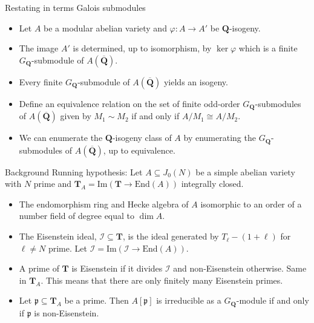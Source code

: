 \documentclass{beamer}
\newcommand{\QQ}{\mathbf{Q}}
\newcommand{\QQbar}{\overline{\mathbf{Q}}}
\newcommand{\TT}{\mathbf{T}}
\newcommand{\I}{\mathcal{I}}
\renewcommand{\Im}{\mathrm{Im}}
\newcommand{\End}{\mathrm{End}}
\newcommand{\p}{\mathfrak{p}}
\begin{document}
\begin{frame}{Restating in terms Galois submodules}
    \begin{itemize}
        \item
            Let $A$ be a modular abelian variety and $\varphi:A\to A'$ be
            $\QQ$-isogeny.
            \pause
        \item
            The image $A'$ is determined, up to isomorphism, by $\ker\varphi$
            which is a finite $G_\QQ$-submodule of $A(\QQbar)$.
            \pause
        \item
            Every finite $G_\QQ$-submodule of $A(\QQbar)$ yields an isogeny.
            \pause
        \item
            Define an equivalence relation on the set of finite odd-order
            $G_\QQ$-submodules of $A(\QQbar)$ given by $M_1\sim M_2$ if and only if
            $A/M_1\cong A/M_2$.
            \pause
        \item
            We can enumerate the $\QQ$-isogeny class of $A$ by enumerating the
            $G_\QQ$-submodules of $A(\QQbar)$, up to equivalence.
    \end{itemize}
\end{frame}

\begin{frame}{Background}
    Running hypothesis: Let $A\subseteq J_0(N)$ be a simple abelian variety
    with $N$ prime and $\TT_A = \Im(\TT\to \End(A))$ integrally closed.
            \pause
    \begin{itemize}
        \item
            The endomorphism ring and Hecke algebra of $A$ isomorphic to an
            order of a number field of degree equal to $\dim A$.
            \pause
        \item
            The Eisenstein ideal, $\mathcal{I}\subseteq \TT$, is the ideal
            generated by $T_\ell-(1+\ell)$ for $\ell\neq N$ prime. Let
            $\I=\Im(\I\to \End(A))$.
            \pause
        \item
            A prime of $\TT$ is Eisenstein if it divides $\I$ and
            non-Eisenstein otherwise. Same in $\TT_A$. This means that there
            are only finitely many Eisenstein primes.
            \pause
        \item
            Let $\p\subseteq \TT_A$ be a prime. Then $A[\p]$ is irreducible as
            a $G_\QQ$-module if and only if $\p$ is non-Eisenstein.
    \end{itemize}
\end{frame}
\end{document}
